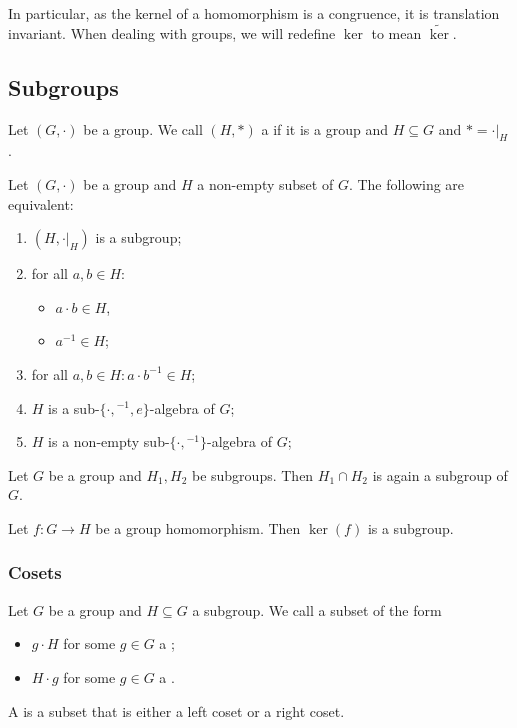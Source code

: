 In particular, as the kernel of a homomorphism is a congruence, it is translation invariant.
When dealing with groups, we will redefine $\ker$ to mean $\widetilde{\ker}$.

\subsection{Subgroups}
\begin{definition}
Let $(G,\boldsymbol{\cdot})$ be a group. We call $(H,*)$ a  if it is a group and $H\subseteq G$ and $* = \boldsymbol{\cdot}|_H$.
\end{definition}

\begin{lemma} \label{subgroupCriterion}
Let $(G,\boldsymbol{\cdot})$ be a group and $H$ a non-empty subset of $G$. The following are equivalent:
\begin{enumerate}
\item $(H,\boldsymbol{\cdot}|_H)$ is a subgroup;
\item for all $a,b\in H$:
\begin{itemize}
\item $a\cdot b \in H$,
\item $a^{-1}\in H$;
\end{itemize}
\item for all $a,b\in H: a\cdot b^{-1} \in H$;
\item $H$ is a sub-$\{\cdot, {}^{-1}, e\}$-algebra of $G$;
\item $H$ is a non-empty sub-$\{\cdot, {}^{-1}\}$-algebra of $G$;
\end{enumerate}
\end{lemma}

\begin{lemma}
Let $G$ be a group and $H_1, H_2$ be subgroups. Then $H_1\cap H_2$ is again a subgroup of $G$.
\end{lemma}
\begin{lemma}
Let $f:G\to H$ be a group homomorphism. Then $\ker(f)$ is a subgroup.
\end{lemma}

\subsubsection{Cosets}
\begin{definition}
Let $G$ be a group and $H\subseteq G$ a subgroup. We call a subset of the form
\begin{itemize}
\item $g\cdot H$ for some $g\in G$ a ;
\item $H\cdot g$ for some $g\in G$ a .
\end{itemize}
A  is a subset that is either a left coset or a right coset.
\end{definition}

